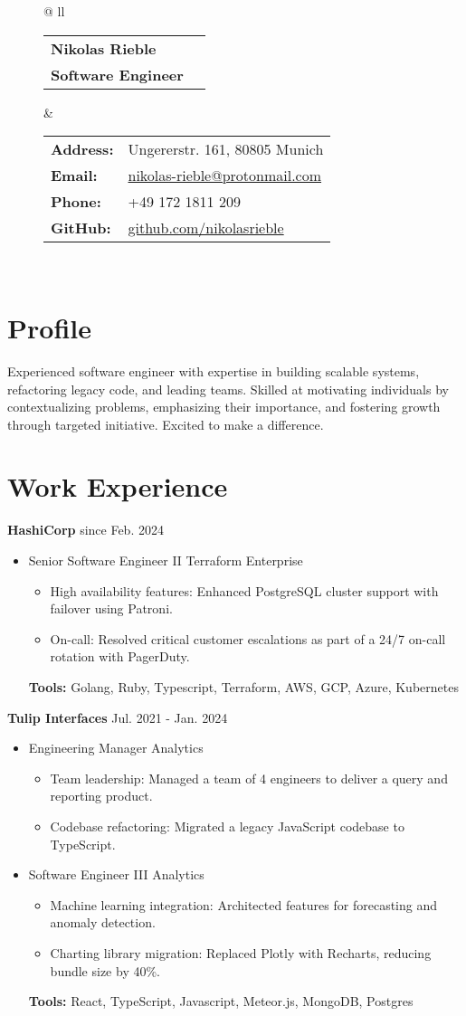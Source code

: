 \documentclass[letterpaper,11pt]{article}
\newcommand{\roleSpacing}{\vspace{4pt}}
\newcommand{\role}[2]{\item{#1 \hfill #2 \\}} %
\newcommand{\station}[2]{\textbf{#1}  \hfill #2 \\} %
\newcommand{\project}[2]{\item\small{#1: #2}} %
\newcommand{\resumeSubHeadingListStart}{\begin{itemize}[leftmargin=*]}
\newcommand{\resumeSubHeadingListEnd}{\end{itemize}}
\newcommand{\projectliststart}{\begin{itemize}[leftmargin=*] \vspace{-5pt} }
\newcommand{\projectlistend}{\end{itemize}\vspace{-5pt}}
\begin{document}
\addtolength{\tabcolsep}{4pt}    %
{\renewcommand{\arraystretch}{1} %
\begin{figure}[t]
	\centering
	\begin{tabular*}{\textwidth}{@{\extracolsep{\fill}} ll}
		\begin{tabular}{@{}ll@{}}
			\textbf{{\Huge Nikolas Rieble}} \\
			\textbf{Software Engineer} \\
		\end{tabular} &
		\begin{tabular}{@{}ll@{}}
			\textbf{Address:} & Ungererstr. 161, 80805 Munich \\
			\textbf{Email:} & \href{mailto:nikolas-rieble@protonmail.com}{nikolas-rieble@protonmail.com} \\
			\textbf{Phone:} & +49 172 1811 209 \\
			\textbf{GitHub:} & \href{https://github.com/nikolasrieble}{github.com/nikolasrieble} \\
		\end{tabular} \\
	\end{tabular*}
\end{figure}
}

\section{Profile}
Experienced software engineer with expertise in building scalable systems, refactoring legacy code, and leading teams. Skilled at motivating individuals by contextualizing problems, emphasizing their importance, and fostering growth through targeted initiative. Excited to make a difference.

\section{Work Experience}

\station{HashiCorp}{since Feb. 2024}
\resumeSubHeadingListStart
\role{Senior Software Engineer II}{Terraform Enterprise}
\projectliststart
\project{High availability features}{Enhanced PostgreSQL cluster support with failover using Patroni.}
\project{On-call}{Resolved critical customer escalations as part of a 24/7 on-call rotation with PagerDuty.}
\projectlistend
\textbf{Tools:} Golang, Ruby, Typescript, Terraform, AWS, GCP, Azure, Kubernetes
\resumeSubHeadingListEnd
\roleSpacing
\station{Tulip Interfaces}{Jul. 2021 - Jan. 2024}
\resumeSubHeadingListStart
\role{Engineering Manager}{Analytics}
\projectliststart
\project{Team leadership}{Managed a team of 4 engineers to deliver a query and reporting product.}
\project{Codebase refactoring}{Migrated a legacy JavaScript codebase to TypeScript.}
\projectlistend
\roleSpacing
\role{Software Engineer III}{Analytics}
\projectliststart
\project{Machine learning integration}{Architected features for forecasting and anomaly detection.}
\project{Charting library migration}{Replaced Plotly with Recharts, reducing bundle size by 40\%.}
\projectlistend
\textbf{Tools:} React, TypeScript, Javascript, Meteor.js, MongoDB, Postgres
\resumeSubHeadingListEnd
\end{document}
